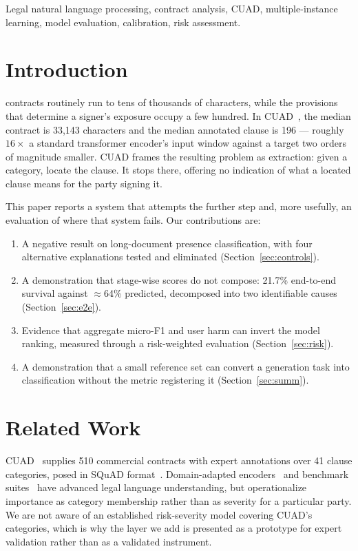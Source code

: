 \documentclass[journal,a4paper]{IEEEtran}
\begin{document}
\begin{IEEEkeywords}
Legal natural language processing, contract analysis, CUAD, multiple-instance learning,
model evaluation, calibration, risk assessment.
\end{IEEEkeywords}

\section{Introduction}
 contracts routinely run to tens of thousands of characters, while the
provisions that determine a signer's exposure occupy a few hundred. In CUAD~\cite{cuad}, the
median contract is 33{,}143 characters and the median annotated clause is 196 --- roughly
$16\times$ a standard transformer encoder's input window against a target two orders of
magnitude smaller. CUAD frames the resulting problem as extraction: given a category, locate
the clause. It stops there, offering no indication of what a located clause means for the party
signing it.

This paper reports a system that attempts the further step and, more usefully, an evaluation of
where that system fails. Our contributions are:

\begin{enumerate}
\item A negative result on long-document presence classification, with four alternative
explanations tested and eliminated (Section~\ref{sec:controls}).
\item A demonstration that stage-wise scores do not compose: 21.7\% end-to-end survival against
$\approx$64\% predicted, decomposed into two identifiable causes (Section~\ref{sec:e2e}).
\item Evidence that aggregate micro-F1 and user harm can invert the model ranking, measured
through a risk-weighted evaluation (Section~\ref{sec:risk}).
\item A demonstration that a small reference set can convert a generation task into
classification without the metric registering it (Section~\ref{sec:summ}).
\end{enumerate}

\section{Related Work}
CUAD~\cite{cuad} supplies 510 commercial contracts with expert annotations over 41 clause
categories, posed in SQuAD format~\cite{squad}. Domain-adapted encoders~\cite{legalbert} and
benchmark suites~\cite{lexglue} have advanced legal language understanding, but operationalize
importance as category membership rather than as severity for a particular party. We are not
aware of an established risk-severity model covering CUAD's categories, which is why the layer
we add is presented as a prototype for expert validation rather than as a validated instrument.
\end{document}
